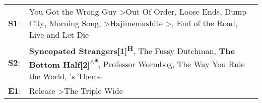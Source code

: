 \begin{supertabular}{p{0.03\textwidth}p{0.92\textwidth}}
 \textbf{S1}:  &  You Got the Wrong Guy\textsuperscript{} \textgreater \enspace Out Of Order\textsuperscript{}, \enspace Loose Ends\textsuperscript{}, \enspace Dump City\textsuperscript{}, \enspace Morning Song\textsuperscript{}, \textsuperscript{} \textgreater \enspace Hajimemashite\textsuperscript{} \textgreater {}\textsuperscript{}, \enspace End of the Road\textsuperscript{}, \enspace Live and Let Die\textsuperscript{}  \enspace  \\
 \textbf{S2}:  &                                                                                                                                  \textbf{Syncopated Strangers[1]\textsuperscript{H}}, \enspace The Fussy Dutchman\textsuperscript{}, \enspace \textbf{The Bottom Half[2]\textsuperscript{$\wedge$*}}, \enspace Professor Wormbog\textsuperscript{}, \enspace The Way You Rule the World\textsuperscript{}, 's Theme\textsuperscript{}  \enspace  \\
 \textbf{E1}:  &                                                                                                                                                                                                                                                                                                                                                                Release\textsuperscript{} \textgreater \enspace The Triple Wide\textsuperscript{}  \enspace  \\
\end{supertabular}
